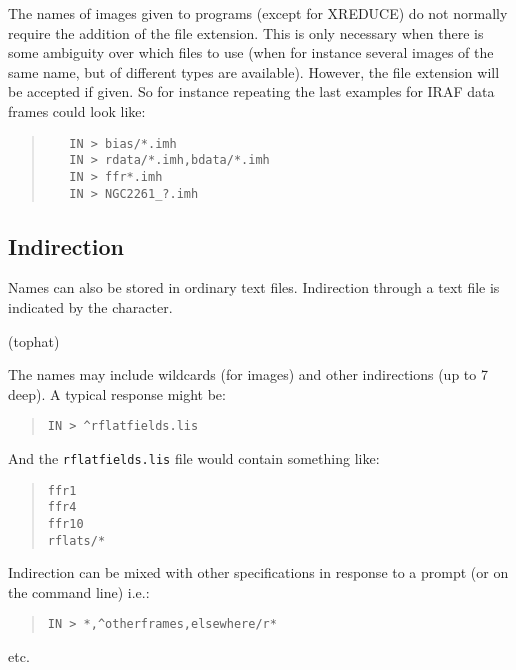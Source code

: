 \documentclass[twoside,11pt]{article}
\newcommand{\htmlref}[2]{#1}
\renewcommand{\_}{\texttt{\symbol{95}}}
\newenvironment{myquote}{\begin{quote}\begin{small}}{\end{small}\end{quote}}
\newcommand{\text}[1]{{\small \tt #1}}
\newcommand{\xroutine}[1]{\htmlref{{\sc #1}}{#1}}
\begin{document}
The names of images given to programs (except for \xroutine{XREDUCE})
do not normally require the addition of the file extension. This
is only necessary when there is some ambiguity over which files to
use (when for instance several images of the same name, but of
different types are available). However, the file extension will
be accepted if given. So for instance repeating the last examples
for IRAF data frames could look like:
\begin{myquote}
\begin{verbatim}
   IN > bias/*.imh
   IN > rdata/*.imh,bdata/*.imh
   IN > ffr*.imh
   IN > NGC2261_?.imh
\end{verbatim}
\end{myquote}

\subsection{Indirection}
Names can also be stored in ordinary text files. Indirection through a
text file is indicated by the character.

\begin{description}
   \item \hspace{13pt}{\bf$^\wedge$}\hspace{3ex}   (tophat)
\end{description}

The names may include wildcards (for images) and other indirections (up to
7 deep). A typical response might be:
\begin{myquote}
\begin{verbatim}
IN > ^rflatfields.lis
\end{verbatim}
\end{myquote}

And the \text{rflatfields.lis} file would contain something like:
\begin{myquote}
\begin{verbatim}
ffr1
ffr4
ffr10
rflats/*
\end{verbatim}
\end{myquote}

Indirection can be mixed with other specifications in response to a
prompt (or on the command line) i.e.:
\begin{myquote}
\begin{verbatim}
IN > *,^otherframes,elsewhere/r*
\end{verbatim}
\end{myquote}
etc.
\end{document}
